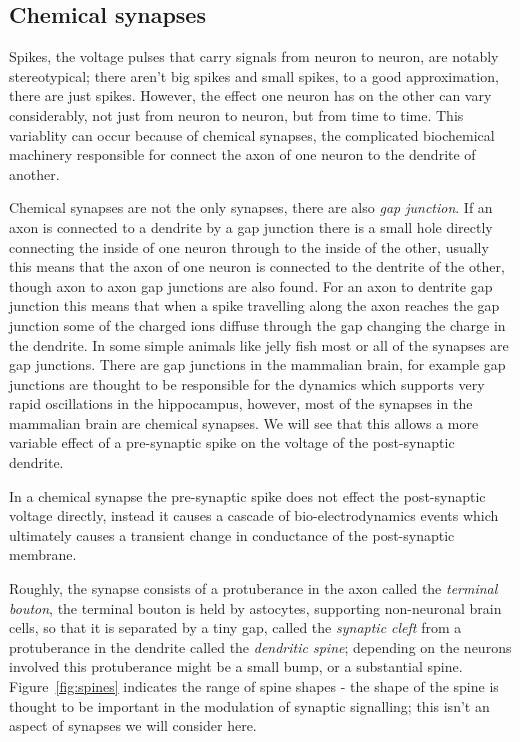 \documentclass[11pt,a4paper]{scrartcl}
\begin{document}
\subsection*{Chemical synapses}

Spikes, the voltage pulses that carry signals from neuron to neuron,
are notably stereotypical; there aren't big spikes and small spikes,
to a good approximation, there are just spikes. However, the effect
one neuron has on the other can vary considerably, not just from
neuron to neuron, but from time to time. This variablity can occur
because of chemical synapses, the complicated biochemical machinery
responsible for connect the axon of one neuron to the dendrite of
another. 

Chemical synapses are not the only synapses, there are also
\textsl{gap junction}. If an axon is connected to a dendrite by a gap
junction there is a small hole directly connecting the inside of one
neuron through to the inside of the other, usually this means that the
axon of one neuron is connected to the dentrite of the other, though
axon to axon gap junctions are also found. For an axon to dentrite gap
junction this means that when a spike travelling along the axon
reaches the gap junction some of the charged ions diffuse through the
gap changing the charge in the dendrite. In some simple animals like
jelly fish most or all of the synapses are gap junctions. There are
gap junctions in the mammalian brain, for example gap junctions are
thought to be responsible for the dynamics which supports very rapid
oscillations in the hippocampus, however, most of the synapses in the
mammalian brain are chemical synapses. We will see that this allows a
more variable effect of a pre-synaptic spike on the voltage of the
post-synaptic dendrite.

In a chemical synapse the pre-synaptic spike does not effect the
post-synaptic voltage directly, instead it causes a cascade of
bio-electrodynamics events which ultimately causes a transient change
in conductance of the post-synaptic membrane. 

Roughly, the synapse consists of a protuberance in the axon called the
\textsl{terminal bouton}, the terminal bouton is held by astocytes,
supporting non-neuronal brain cells, so that it is separated by a tiny
gap, called the \textsl{synaptic cleft} from a protuberance in the
dendrite called the \textsl{dendritic spine}; depending on the neurons
involved this protuberance might be a small bump, or a substantial
spine. Figure~\ref{fig:spines} indicates the range of spine shapes -
the shape of the spine is thought to be important in the modulation of
synaptic signalling; this isn't an aspect of synapses we will consider here.
\end{document}
